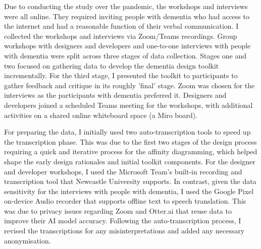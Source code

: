Due to conducting the study over the pandemic, the workshops and interviews were all online. They required inviting people with dementia who had access to the internet and had a reasonable function of their verbal communication. I collected the workshops and interviews via Zoom/Teams recordings. Group workshops with designers and developers and one-to-one interviews with people with dementia were split across three stages of data collection. Stages one and two focused on gathering data to develop the dementia design toolkit incrementally. For the third stage, I presented the toolkit to participants to gather feedback and critique in its roughly 'final' stage. Zoom was chosen for the interviews as the participants with dementia preferred it. Designers and developers joined a scheduled Teams meeting for the workshops, with additional activities on a shared online whiteboard space (a Miro board).

For preparing the data, I initially used two auto-transcription tools to speed up the transcription phase. This was due to the first two stages of the design process requiring a quick and iterative process for the affinity diagramming, which helped shape the early design rationales and initial toolkit components. For the designer and developer workshops, I used the Microsoft Team's built-in recording and transcription tool that Newcastle University supports. In contrast, given the data sensitivity for the interviews with people with dementia, I used the Google Pixel on-device Audio recorder that supports offline text to speech translation. This was due to privacy issues regarding Zoom and Otter.ai that reuse data to improve their AI model accuracy. Following the auto-transcription process, I revised the transcriptions for any misinterpretations and added any necessary anonymisation. 

